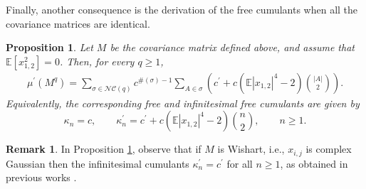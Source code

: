 \documentclass{article}
\newtheorem{proposition}[theorem]{Proposition}
\theoremstyle{definition}
\newtheorem{remark}     [theorem]{Remark}
\newcommand{\E}{\mathbb{E}}
\newcommand{\NC}{\mathcal{NC}}
\begin{document}
Finally, another consequence is the derivation of the free cumulants when all the covariance matrices are identical.

\begin{proposition}\label{Proposition: inf moments of covariant matrix}
Let \(M\) be the covariance matrix defined above, and assume that
\(\E[x_{1,2}^{2}]=0\). Then, for every \(q\geq 1\),
\begin{align*}
\mu^\prime(M^q)
=
\sum_{\sigma\in\NC(q)}
c^{\#(\sigma)-1}
\sum_{A\in\sigma}
\left(
c^\prime
+
c(\mathbb{E}|x_{1,2}|^4-2)\binom{|A|}{2}
\right).
\end{align*}
Equivalently, the corresponding free and infinitesimal free cumulants
are given by
\[
\kappa_n=c,
\qquad
\kappa_n^\prime
=
c^\prime
+
c(\mathbb{E}|x_{1,2}|^4-2)\binom{n}{2},
\qquad n\geq 1.
\]
\end{proposition}

\begin{remark}
In Proposition \ref{Proposition: inf moments of covariant matrix}, observe that if $M$ is Wishart, i.e., $x_{i,j}$ is complex Gaussian then the infinitesimal cumulants $\kappa_n^\prime=c^\prime$ for all $n\geq 1$, as obtained in previous works \cite[Theorem 30]{Mingo19}.
\end{remark}




\end{document}
